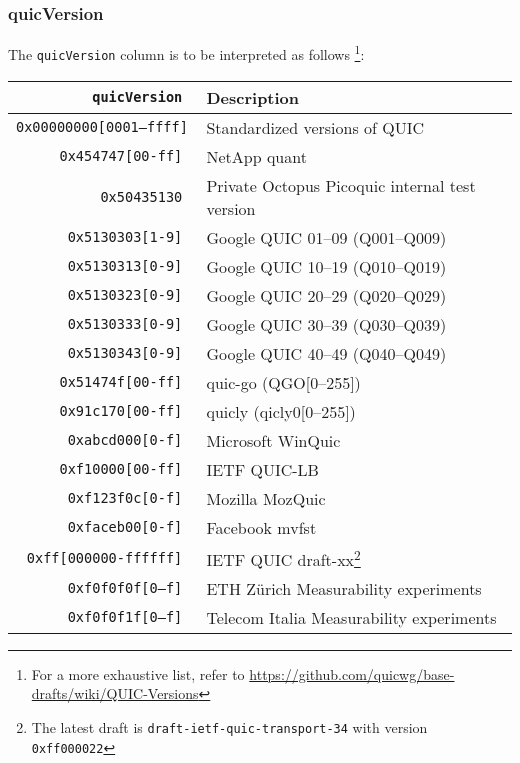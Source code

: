 \documentclass[documentation]{subfiles}
\begin{document}
\subsubsection{quicVersion}\label{quicVersion}
The {\tt quicVersion} column is to be interpreted as follows%
\footnote{For a more exhaustive list, refer to \url{https://github.com/quicwg/base-drafts/wiki/QUIC-Versions}}:
\begin{longtable}{>{\tt}rl}
    \toprule
    {\bf quicVersion}      & {\bf Description}\\
    \midrule\endhead%
    0x00000000[0001--ffff] & Standardized versions of QUIC\\
    0x454747[00-ff]        & NetApp quant\\
    0x50435130             & Private Octopus Picoquic internal test version\\
    0x5130303[1-9]         & Google QUIC 01--09 (Q001--Q009)\\
    0x5130313[0-9]         & Google QUIC 10--19 (Q010--Q019)\\
    0x5130323[0-9]         & Google QUIC 20--29 (Q020--Q029)\\
    0x5130333[0-9]         & Google QUIC 30--39 (Q030--Q039)\\
    0x5130343[0-9]         & Google QUIC 40--49 (Q040--Q049)\\
    0x51474f[00-ff]        & quic-go (QGO[0--255])\\
    0x91c170[00-ff]        & quicly (qicly0[0--255])\\
    0xabcd000[0-f]         & Microsoft WinQuic\\
    0xf10000[00-ff]        & IETF QUIC-LB\\
    0xf123f0c[0-f]         & Mozilla MozQuic\\
    0xfaceb00[0-f]         & Facebook mvfst\\
    0xff[000000-ffffff]    & IETF QUIC draft-xx\footnote{The latest draft is {\tt draft-ietf-quic-transport-34} with version {\tt 0xff000022}}\\
    0xf0f0f0f[0--f]        & ETH Zürich Measurability experiments\\
    0xf0f0f1f[0--f]        & Telecom Italia Measurability experiments\\
    \bottomrule
\end{longtable}
\end{document}
